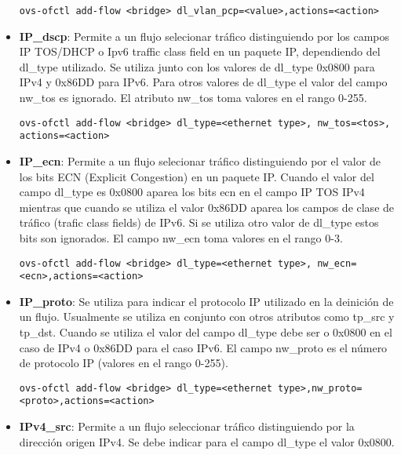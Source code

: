 \begin{itemize}
\begin{center}
\texttt{ovs-ofctl add-flow <bridge> dl\_vlan\_pcp=<value>,actions=<action>}
\end{center}

\item \textbf{IP\_dscp}: Permite a un flujo selecionar tr\'afico distinguiendo por los campos IP TOS/DHCP o Ipv6 traffic class field en un paquete IP, dependiendo del dl\_type utilizado. Se utiliza junto con los valores de dl\_type 0x0800 para IPv4 y 0x86DD para IPv6. Para otros valores de dl\_type el valor del campo nw\_tos es ignorado. El atributo nw\_tos toma valores en el rango 0-255.

\begin{center}
\texttt{ovs-ofctl add-flow <bridge> dl\_type=<ethernet type>, nw\_tos=<tos>, actions=<action>}
\end{center}

\item \textbf{IP\_ecn}: Permite a un flujo selecionar tr\'afico distinguiendo por el valor de los bits ECN (Explicit Congestion) en un paquete IP. Cuando el valor del campo dl\_type es 0x0800 aparea los bits ecn en el campo IP TOS IPv4 mientras que cuando se utiliza el valor 0x86DD aparea los campos de clase de tr\'afico (trafic class fields) de IPv6. Si se utiliza otro valor de dl\_type estos bits son ignorados. El campo nw\_ecn toma valores en el rango 0-3.

\begin{center}
\texttt{ovs-ofctl add-flow <bridge> dl\_type=<ethernet type>, nw\_ecn=<ecn>,actions=<action>}
\end{center}

\item \textbf{IP\_proto}: Se utiliza para indicar el protocolo IP utilizado en la deinici\'on de un flujo. Usualmente se utiliza en conjunto con otros atributos como tp\_src y tp\_dst. Cuando se utiliza el valor del campo dl\_type debe ser o 0x0800 en el caso de IPv4 o 0x86DD para el caso IPv6. El campo nw\_proto es el n\'umero de protocolo IP (valores en el rango 0-255).

\begin{center}
\texttt{ovs-ofctl add-flow <bridge> dl\_type=<ethernet type>,nw\_proto=<proto>,actions=<action>}
\end{center}

\item \textbf{IPv4\_src}: Permite a un flujo seleccionar tr\'afico distinguiendo por la dirección origen IPv4. Se debe indicar para el campo dl\_type el valor 0x0800.  


\end{itemize}
